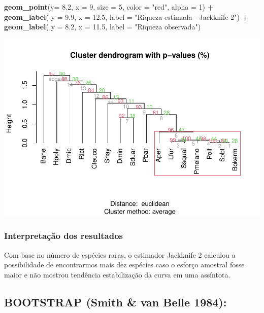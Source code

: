 \documentclass[
]{book}
\newenvironment{Shaded}{\begin{snugshade}}{\end{snugshade}}
\newcommand{\DataTypeTok}[1]{\textcolor[rgb]{0.13,0.29,0.53}{#1}}
\newcommand{\DecValTok}[1]{\textcolor[rgb]{0.00,0.00,0.81}{#1}}
\newcommand{\FloatTok}[1]{\textcolor[rgb]{0.00,0.00,0.81}{#1}}
\newcommand{\KeywordTok}[1]{\textcolor[rgb]{0.13,0.29,0.53}{\textbf{#1}}}
\newcommand{\NormalTok}[1]{#1}
\newcommand{\OperatorTok}[1]{\textcolor[rgb]{0.81,0.36,0.00}{\textbf{#1}}}
\newcommand{\StringTok}[1]{\textcolor[rgb]{0.31,0.60,0.02}{#1}}
\begin{document}
\begin{Shaded}
\begin{Highlighting}[]
\StringTok{  }\KeywordTok{geom_point}\NormalTok{(}\DataTypeTok{y=} \FloatTok{8.2}\NormalTok{, }\DataTypeTok{x =} \DecValTok{9}\NormalTok{, }\DataTypeTok{size =} \DecValTok{5}\NormalTok{, }\DataTypeTok{color =} \StringTok{"red"}\NormalTok{, }\DataTypeTok{alpha =} \DecValTok{1}\NormalTok{) }\OperatorTok{+}\StringTok{ }
\StringTok{  }\KeywordTok{geom_label}\NormalTok{( }\DataTypeTok{y =} \FloatTok{9.9}\NormalTok{, }\DataTypeTok{x =} \FloatTok{12.5}\NormalTok{, }\DataTypeTok{label =} \StringTok{"Riqueza estimada - Jackknife 2"}\NormalTok{) }\OperatorTok{+}
\StringTok{  }\KeywordTok{geom_label}\NormalTok{( }\DataTypeTok{y =} \FloatTok{8.2}\NormalTok{, }\DataTypeTok{x =} \FloatTok{11.5}\NormalTok{, }\DataTypeTok{label =} \StringTok{"Riqueza observada"}\NormalTok{)}
\end{Highlighting}
\end{Shaded}

\includegraphics{livro_r_ecologia_files/figure-latex/unnamed-chunk-29-1.pdf}

\hypertarget{interpretauxe7uxe3o-dos-resultados-4}{%
\subsubsection{Interpretação dos resultados}\label{interpretauxe7uxe3o-dos-resultados-4}}

Com base no número de espécies raras, o estimador Jackknife 2 calculou a possibilidade de encontrarmos mais dez espécies caso o esforço amostral fosse maior e não mostrou tendência estabilização da curva em uma assíntota.

\hypertarget{bootstrap-smith-van-belle-1984}{%
\subsection{BOOTSTRAP (Smith \& van Belle 1984):}\label{bootstrap-smith-van-belle-1984}}
\end{document}
